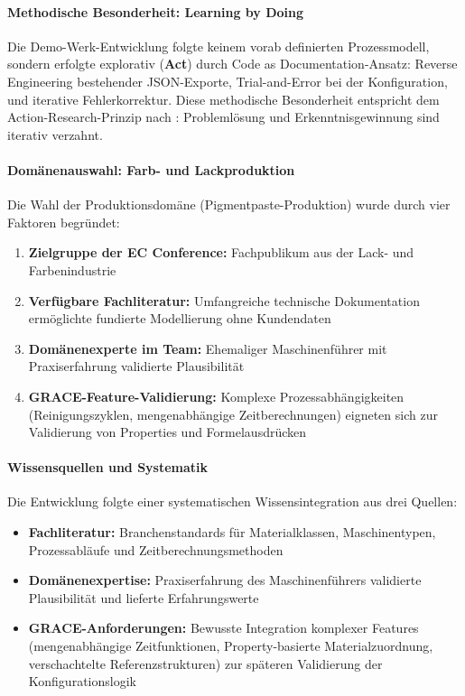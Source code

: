 \paragraph{Methodische Besonderheit: Learning by Doing}

Die Demo-Werk-Entwicklung folgte keinem vorab definierten Prozessmodell, sondern erfolgte explorativ (\textbf{Act}) durch \glqq Code as Documentation\grqq{}-Ansatz: Reverse Engineering bestehender JSON-Exporte, Trial-and-Error bei der Konfiguration, und iterative Fehlerkorrektur. Diese methodische Besonderheit entspricht dem Action-Research-Prinzip nach \cite{lewin:action_research1946}: Problemlösung und Erkenntnisgewinnung sind iterativ verzahnt.

\paragraph{Domänenauswahl: Farb- und Lackproduktion}

Die Wahl der Produktionsdomäne (Pigmentpaste-Produktion) wurde durch vier Faktoren begründet:

\begin{enumerate}
    \item \textbf{Zielgruppe der EC Conference:} Fachpublikum aus der Lack- und Farbenindustrie
    \item \textbf{Verfügbare Fachliteratur:} Umfangreiche technische Dokumentation ermöglichte fundierte Modellierung ohne Kundendaten
    \item \textbf{Domänenexperte im Team:} Ehemaliger Maschinenführer mit Praxiserfahrung validierte Plausibilität
    \item \textbf{GRACE-Feature-Validierung:} Komplexe Prozessabhängigkeiten (Reinigungszyklen, mengenabhängige Zeitberechnungen) eigneten sich zur Validierung von Properties und Formelausdrücken
\end{enumerate}

\paragraph{Wissensquellen und Systematik}

Die Entwicklung folgte einer systematischen Wissensintegration aus drei Quellen:

\begin{itemize}
    \item \textbf{Fachliteratur:} Branchenstandards für Materialklassen, Maschinentypen, Prozessabläufe und Zeitberechnungsmethoden \citep{vci:lacke_farben2018, mueller:lackformulierung2017, goldschmidt:lackproduktion2019, REFA2012}
    \item \textbf{Domänenexpertise:} Praxiserfahrung des Maschinenführers validierte Plausibilität und lieferte Erfahrungswerte \citep{grace:fragensammlung_maschine2025}
    \item \textbf{GRACE-Anforderungen:} Bewusste Integration komplexer Features (mengenabhängige Zeitfunktionen, Property-basierte Materialzuordnung, verschachtelte Referenzstrukturen) zur späteren Validierung der Konfigurationslogik
\end{itemize}

